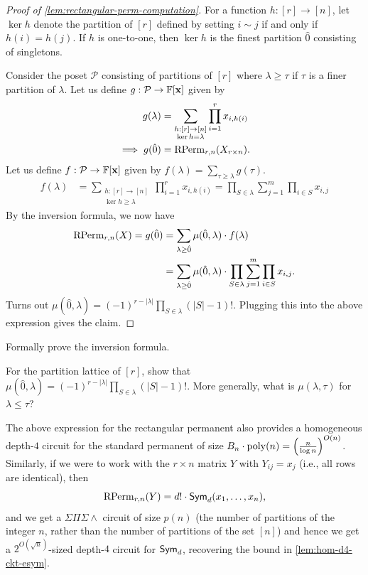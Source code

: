 \begin{proof}[Proof of \cref{lem:rectangular-perm-computation}]
  For a function $h:[r]\rightarrow [n]$, let $\ker h$ denote the partition of $[r]$ defined by setting $i \sim j$ if and only if $h(i) = h(j)$. If $h$ is one-to-one, then $\ker h$ is the finest partition $\hat{0}$ consisting of singletons. 

  Consider the poset $\mathcal{P}$ consisting of partitions of $[r]$ where $\lambda \geq \tau$ if $\tau$ is a finer partition of $\lambda$. Let us define $g: \mathcal{P} \rightarrow \mathbb{F}[\mathbf{x}]$ given by 
  \begin{align*}
    g(\lambda) & = \sum_{\substack{h: [r] \rightarrow [n]\\ \ker h = \lambda}} \prod_{i=1}^r x_{i, h(i)}\\
    \implies g(\hat{0}) & = \operatorname{\mathrm{RPerm}}_{r,n}(X_{r\times n}).
  \end{align*}
  Let us define $f: \mathcal{P} \rightarrow \mathbb{F}[\mathbf{x}]$ given by $f(\lambda) = \sum_{\tau \geq \lambda} g(\tau)$.
  \begin{align*}
  f(\lambda) & = \sum_{\substack{h: [r] \rightarrow [n]\\ \ker h \geq \lambda}} \prod_{i=1}^r x_{i, h(i)} = \prod_{S \in \lambda} \sum_{j=1}^m \prod_{i\in S} x_{i, j}
  \end{align*}
  By the \Mobius{} inversion formula, we now have
  \begin{align*}
    \operatorname{\mathrm{RPerm}}_{r,n}(X) = g(\hat{0}) & = \sum_{\lambda \geq \hat{0}} \mu(\hat{0}, \lambda) \cdot f(\lambda)\\
                                 & = \sum_{\lambda \geq \hat{0}} \mu(\hat{0}, \lambda) \cdot \prod_{S \in \lambda} \sum_{j=1}^m \prod_{i\in S} x_{i, j}.
  \end{align*}
  Turns out $\mu(\hat{0}, \lambda) = (-1)^{r - |\lambda|} \prod_{S \in \lambda} (|S| - 1)!$. Plugging this into the above expression gives the claim. 
\end{proof}

\begin{exercise}
Formally prove the \Mobius{} inversion formula.

For the partition lattice of $[r]$, show that $\mu(\hat{0}, \lambda) = (-1)^{r - |\lambda|} \prod_{S \in \lambda} (|S| - 1)!$. More generally, what is $\mu(\lambda, \tau)$ for $\lambda \leq \tau$?
\end{exercise}


The above expression for the rectangular permanent also provides a homogeneous depth-$4$ circuit for the standard permanent of size $B_n \cdot \operatorname{poly}(n) = \left(\frac{n}{\log n}\right)^{O(n)}$. Similarly, if we were to work with the $r \times n$ matrix $Y$ with $Y_{ij} = x_j$ (i.e., all rows are identical), then 
\[
\operatorname{\mathrm{RPerm}}_{r,n}(Y) = d! \cdot \operatorname{\mathsf{Sym}}_d(x_1,\ldots, x_n),
\]
and we get a $\Sigma\Pi\Sigma\wedge$ circuit of size $p(n)$ (the number of partitions of the integer $n$, rather than the number of partitions of the set $[n]$) and hence we get a $2^{O(\sqrt{n})}$-sized depth-$4$ circuit for $\operatorname{\mathsf{Sym}}_d$, recovering the bound in \cref{lem:hom-d4-ckt-esym}. 


